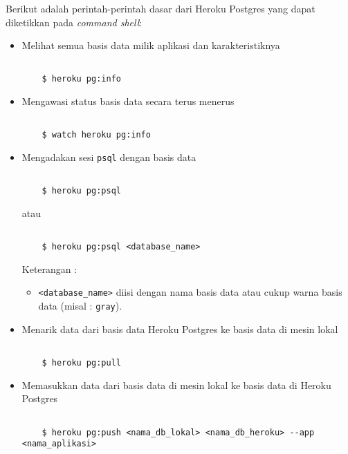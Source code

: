Berikut adalah perintah-perintah dasar dari Heroku Postgres yang dapat diketikkan pada \textit{command shell}:
\begin{itemize}
\item Melihat semua basis data milik aplikasi dan karakteristiknya

\begin{lstlisting}

	$ heroku pg:info

\end{lstlisting}

\item Mengawasi status basis data secara terus menerus

\begin{lstlisting}

	$ watch heroku pg:info

\end{lstlisting}

\item Mengadakan sesi \texttt{psql} dengan basis data

\begin{lstlisting}

	$ heroku pg:psql

\end{lstlisting}
atau
\begin{lstlisting}

	$ heroku pg:psql <database_name>

\end{lstlisting}
Keterangan :
\begin{itemize}
\item \texttt{<database\_name>} diisi dengan nama basis data atau cukup warna basis data (misal : \texttt{gray}).
\end{itemize}

\item Menarik data dari basis data Heroku Postgres ke basis data di mesin lokal

\begin{lstlisting}

	$ heroku pg:pull

\end{lstlisting}

\item Memasukkan data dari basis data di mesin lokal ke basis data di Heroku Postgres

\begin{lstlisting}

	$ heroku pg:push <nama_db_lokal> <nama_db_heroku> --app <nama_aplikasi>


\end{lstlisting}
\end{itemize}
